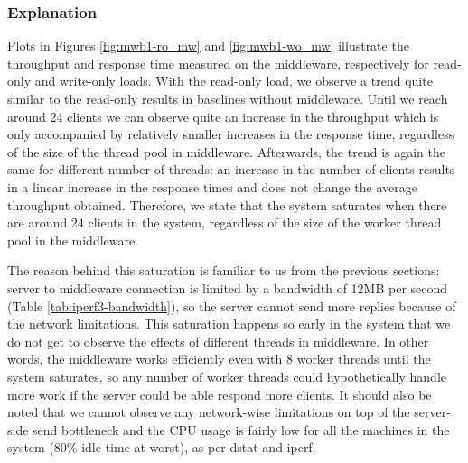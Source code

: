 \documentclass[11pt,a4paper]{article}
\begin{document}
\subsubsection{Explanation} \label{sec:mwb1-exp}
Plots in Figures \ref{fig:mwb1-ro_mw} and \ref{fig:mwb1-wo_mw} illustrate the throughput and response time measured on the middleware, respectively for read-only and write-only loads. With the read-only load, we observe a trend quite similar to the read-only results in baselines without middleware. Until we reach around 24 clients we can observe quite an increase in the throughput which is only accompanied by relatively smaller increases in the response time, regardless of the size of the thread pool in middleware. Afterwards, the trend is again the same for different number of threads: an increase in the number of clients results in a linear increase in the response times and does not change the average throughput obtained. Therefore, we state that the system saturates when there are around 24 clients in the system, regardless of the size of the worker thread pool in the middleware.
\par The reason behind this saturation is familiar to us from the previous sections: server to middleware connection is limited by a bandwidth of 12MB per second (Table \ref{tab:iperf3-bandwidth}), so the server cannot send more replies because of the network limitations. This saturation happens so early in the system that we do not get to observe the effects of different threads in middleware. In other words, the middleware works efficiently even with 8 worker threads until the system saturates, so any number of worker threads could hypothetically handle more work if the server could be able respond more clients. It should also be noted that we cannot observe any network-wise limitations on top of the server-side send bottleneck and the CPU usage is fairly low for all the machines in the system ($80\%$ idle time at worst), as per dstat and iperf. 
\end{document}
